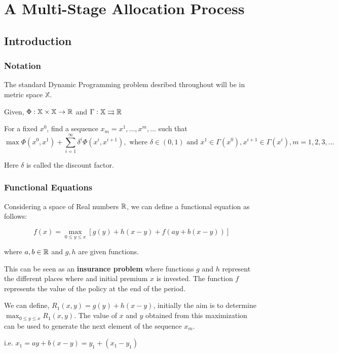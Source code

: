 
\section{A Multi-Stage Allocation Process}

\subsection{Introduction}
\subsubsection{Notation}

The standard Dynamic Programming problem desribed throughout will be in metric space $\mathbb{X}$.

Given, $\Phi: \mathbb{X} \times \mathbb{X} \to \mathbb{R}$ and $\Gamma: \mathbb{X} \rightrightarrows \mathbb{R}$

For a fixed $x^0$, find a sequence ${x_m} = {x^1, ..., x^m, ...}$ such that
$$
\max \Phi(x^0, x^1) + \sum_{i=1}^{\infty}\delta^i \Phi(x^i, x^{i+1}), \text{ where } \delta \in (0,1) \text{ and } x^1 \in \Gamma(x^0), x^{i+1} \in \Gamma(x^i), m = 1,2,3,...
$$

Here $\delta$ is called the discount factor.

\subsubsection{Functional Equations}

Considering a space of Real numbers $\mathbb{R}$, we can define a functional equation as follows:

$$
f(x) = \max_{0 \le y \le x} [g(y) + h(x-y) + f(ay+b(x-y))]
$$

where $a,b \in \mathbb{R}$ and $g,h$ are given functions.

This can be seen as an \textbf{insurance problem} where functions $g$ and $h$ represent the different places where and initial premium $x$ is invested. The function $f$ represents the value of the policy at the end of the period.

\vspace{5mm}
We can define, $R_1(x, y) = g(y) + h(x-y)$, initially the aim is to determine $\max_{0 \le y \le x} R_1(x, y)$. The value of $x$ and $y$ obtained from this maximization can be used to generate the next element of the sequence $x_m$.

i.e. $x_1 = ay + b(x-y) = y_1 + (x_1-y_1)$

